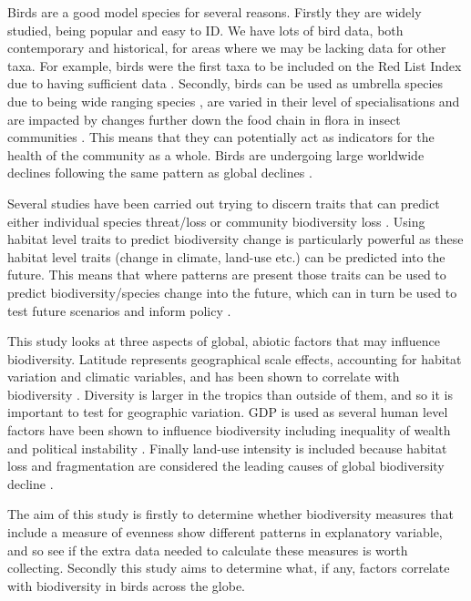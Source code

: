 \documentclass[11pt]{article}
\begin{document}
Birds are a good model species for several reasons. Firstly they are widely studied, being popular and easy to ID. We have lots of bird data, both contemporary and historical, for areas where we may be lacking data for other taxa. For example, birds were the first taxa to be included on the Red List Index due to having sufficient data \parencite{Butchart2004}. Secondly, birds can be used as umbrella species due to being wide ranging species \parencite{Suter2002}, are varied in their level of specialisations and are impacted by changes further down the food chain in flora in insect communities \parencite{BURGHARDT2009}. This means that they can potentially act as indicators for the health of the community as a whole. Birds are undergoing large worldwide declines following the same pattern as global declines \parencite{Pimm2006}.

Several studies have been carried out trying to discern traits that can predict either individual species threat/loss \parencite{AmecayJuarez2014,Cardillo2004,Purvis2000} or community biodiversity loss \parencite{DePalma2016}. Using habitat level traits to predict biodiversity change is particularly powerful as these habitat level traits (change in climate, land-use etc.) can be predicted into the future. This means that where patterns are present those traits can be used to predict biodiversity/species change into the future, which can in turn be used to test future scenarios and inform policy \parencite{Newbold2015}. 

This study looks at three aspects of global, abiotic factors that may influence biodiversity. Latitude represents geographical scale effects, accounting for habitat variation and climatic variables, and has been shown to correlate with biodiversity \parencite{Gaston2000}. Diversity is larger in the tropics than outside of them, and so it is important to test for geographic variation. GDP is used as several human level factors have been shown to influence biodiversity including inequality of wealth and political instability \parencite{HANSON2009,Mikkelson2007}. Finally land-use intensity is included because habitat loss and fragmentation are considered the leading causes of global biodiversity decline \parencite{Dirzo2004}.

The aim of this study is firstly to determine whether biodiversity measures that include a measure of evenness show different patterns in explanatory variable, and so see if the extra data needed to calculate these measures is worth collecting. Secondly this study aims to determine what, if any, factors correlate with biodiversity in birds across the globe.
\newpage
\end{document}
